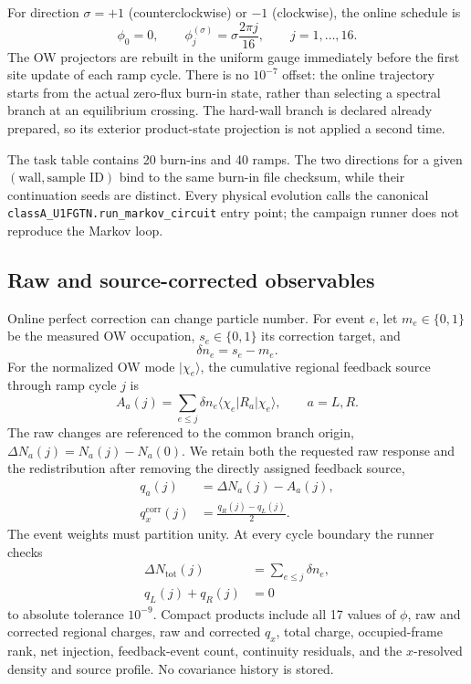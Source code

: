 \documentclass[aps,prb,twocolumn,floatfix,nofootinbib,superscriptaddress]{revtex4-2}
\newcommand{\code}[1]{\texttt{#1}}
\begin{document}
For direction $\sigma=+1$ (counterclockwise) or $-1$ (clockwise), the online
schedule is
\begin{equation}
  \phi_0=0,
  \qquad
  \phi_j^{(\sigma)}=\sigma\frac{2\pi j}{16},
  \qquad j=1,\ldots,16.
  \label{eq:online-schedule}
\end{equation}
The OW projectors are rebuilt in the uniform gauge immediately before the
first site update of each ramp cycle.  There is no $10^{-7}$ offset: the online
trajectory starts from the actual zero-flux burn-in state, rather than
selecting a spectral branch at an equilibrium crossing.  The hard-wall branch
is declared already prepared, so its exterior product-state projection is not
applied a second time.

The task table contains 20 burn-ins and 40 ramps.  The two directions for a
given $(\text{wall},\text{sample ID})$ bind to the same burn-in file checksum,
while their continuation seeds are distinct.  Every physical evolution calls
the canonical \code{classA\_U1FGTN.run\_markov\_circuit} entry point; the
campaign runner does not reproduce the Markov loop.

\subsection{Raw and source-corrected observables}

Online perfect correction can change particle number.  For event $e$, let
$m_e\in\{0,1\}$ be the measured OW occupation, $s_e\in\{0,1\}$ its correction
target, and
\begin{equation}
  \delta n_e=s_e-m_e.
\end{equation}
For the normalized OW mode $\lvert\chi_e\rangle$, the cumulative regional
feedback source through ramp cycle $j$ is
\begin{equation}
  A_a(j)=\sum_{e\le j}\delta n_e
  \langle\chi_e|R_a|\chi_e\rangle,
  \qquad a=L,R.
  \label{eq:source}
\end{equation}
The raw changes are referenced to the common branch origin,
$\Delta N_a(j)=N_a(j)-N_a(0)$.  We retain both the requested raw response and
the redistribution after removing the directly assigned feedback source,
\begin{align}
  q_a(j)&=\Delta N_a(j)-A_a(j),\\
  q_x^{\mathrm{corr}}(j)&=\frac{q_R(j)-q_L(j)}{2}.
  \label{eq:corrected}
\end{align}
The event weights must partition unity.  At every cycle boundary the runner
checks
\begin{align}
  \Delta N_{\mathrm{tot}}(j)&=\sum_{e\le j}\delta n_e,\\
  q_L(j)+q_R(j)&=0
\end{align}
to absolute tolerance $10^{-9}$.  Compact products include all 17 values of
$\phi$, raw and corrected regional charges, raw and corrected $q_x$, total
charge, occupied-frame rank, net injection, feedback-event count, continuity
residuals, and the $x$-resolved density and source profile.  No covariance
history is stored.
\end{document}
